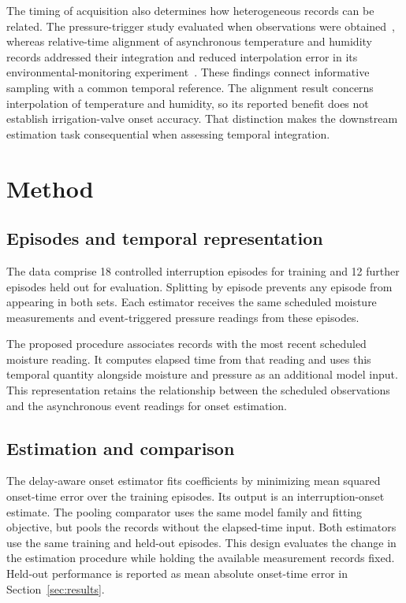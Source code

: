 The timing of acquisition also determines how heterogeneous records can be related. The pressure-trigger study evaluated when observations were obtained~\cite{event2023}, whereas relative-time alignment of asynchronous temperature and humidity records addressed their integration and reduced interpolation error in its environmental-monitoring experiment~\cite{alignment2024}. These findings connect informative sampling with a common temporal reference. The alignment result concerns interpolation of temperature and humidity, so its reported benefit does not establish irrigation-valve onset accuracy. That distinction makes the downstream estimation task consequential when assessing temporal integration.

\section{Method}
\label{sec:method}
\subsection{Episodes and temporal representation}
The data comprise 18 controlled interruption episodes for training and 12 further episodes held out for evaluation. Splitting by episode prevents any episode from appearing in both sets. Each estimator receives the same scheduled moisture measurements and event-triggered pressure readings from these episodes.

The proposed procedure associates records with the most recent scheduled moisture reading. It computes elapsed time from that reading and uses this temporal quantity alongside moisture and pressure as an additional model input. This representation retains the relationship between the scheduled observations and the asynchronous event readings for onset estimation.

\subsection{Estimation and comparison}
The delay-aware onset estimator fits coefficients by minimizing mean squared onset-time error over the training episodes. Its output is an interruption-onset estimate. The pooling comparator uses the same model family and fitting objective, but pools the records without the elapsed-time input. Both estimators use the same training and held-out episodes. This design evaluates the change in the estimation procedure while holding the available measurement records fixed. Held-out performance is reported as mean absolute onset-time error in Section~\ref{sec:results}.

